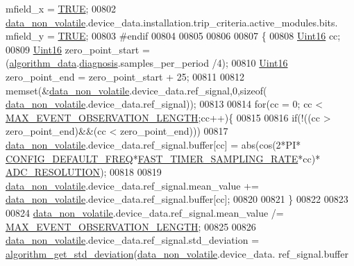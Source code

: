 \begin{DoxyCode}
      mfield\_x     = \hyperlink{a00040_aa8cecfc5c5c054d2875c03e77b7be15d}{TRUE};
00802         \hyperlink{a00060_a76ac5f917f5308dcd83de0d7c94559fb}{data\_non\_volatile}.device\_data.installation.trip\_criteria.active\_modules.bits.
      mfield\_y     = \hyperlink{a00040_aa8cecfc5c5c054d2875c03e77b7be15d}{TRUE};
00803 \textcolor{preprocessor}{#endif}
00804 
00805 
00806 
00807     \{
00808         \hyperlink{a00072_a59a9f6be4562c327cbfb4f7e8e18f08b}{Uint16} cc;
00809         \hyperlink{a00072_a59a9f6be4562c327cbfb4f7e8e18f08b}{Uint16} zero\_point\_start = (\hyperlink{a00016_a183caa40cd01e79ee309cc9c4a225197}{algorithm\_data}.\hyperlink{a00016_a16f85d57ec98b4ad05f5a2e10536b3c6}{diagnosis}.samples\_per\_period
      /4);
00810         \hyperlink{a00072_a59a9f6be4562c327cbfb4f7e8e18f08b}{Uint16} zero\_point\_end   = zero\_point\_start + 25;
00811 
00812         memset(&\hyperlink{a00060_a76ac5f917f5308dcd83de0d7c94559fb}{data\_non\_volatile}.device\_data.ref\_signal,0,\textcolor{keyword}{sizeof}(
      \hyperlink{a00060_a76ac5f917f5308dcd83de0d7c94559fb}{data\_non\_volatile}.device\_data.ref\_signal));
00813 
00814         \textcolor{keywordflow}{for}(cc = 0; cc < \hyperlink{a00022_aa060aeb1ecb530b3c6f6d91060999b70}{MAX\_EVENT\_OBSERVATION\_LENGTH};cc++)\{
00815 
00816         \textcolor{keywordflow}{if}(!((cc > zero\_point\_end)&&(cc < zero\_point\_end)))
00817         \hyperlink{a00060_a76ac5f917f5308dcd83de0d7c94559fb}{data\_non\_volatile}.device\_data.ref\_signal.buffer[cc]  = abs(cos(2*PI*
      \hyperlink{a00021_a985a153b3edd3d7d638137ae0b9e5e67}{CONFIG\_DEFAULT\_FREQ}*\hyperlink{a00021_a3a4dcb8af26a561d90607a41a3745806}{FAST\_TIMER\_SAMPLING\_RATE}*cc)*
      \hyperlink{a00058_a00978ca9e8220475258dcbbbb7d29129}{ADC\_RESOLUTION});
00818 
00819         \hyperlink{a00060_a76ac5f917f5308dcd83de0d7c94559fb}{data\_non\_volatile}.device\_data.ref\_signal.mean\_value +=
      \hyperlink{a00060_a76ac5f917f5308dcd83de0d7c94559fb}{data\_non\_volatile}.device\_data.ref\_signal.buffer[cc];
00820 
00821         \}
00822 
00823 
00824           \hyperlink{a00060_a76ac5f917f5308dcd83de0d7c94559fb}{data\_non\_volatile}.device\_data.ref\_signal.mean\_value /=
      \hyperlink{a00022_aa060aeb1ecb530b3c6f6d91060999b70}{MAX\_EVENT\_OBSERVATION\_LENGTH};
00825 
00826           \hyperlink{a00060_a76ac5f917f5308dcd83de0d7c94559fb}{data\_non\_volatile}.device\_data.ref\_signal.std\_deviation = 
      \hyperlink{a00016_a97eb6437dda088f144d791e49cd3dc2a}{algorithm\_get\_std\_deviation}(\hyperlink{a00060_a76ac5f917f5308dcd83de0d7c94559fb}{data\_non\_volatile}.device\_data.
      ref\_signal.buffer

\end{DoxyCode}
